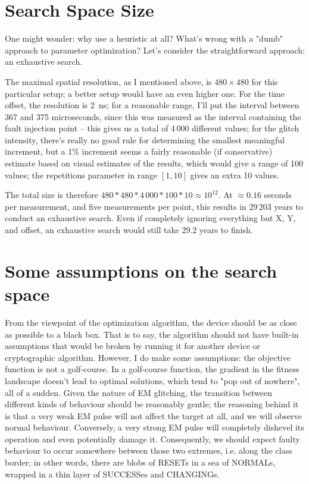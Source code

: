 \documentclass[times, utf8, diplomski]{fer}
\begin{document}
\section{Search Space Size}\label{sec:search_space}
One might wonder: why use a heuristic at all? What's wrong with a "dumb"
approach to parameter optimization? Let's consider the straightforward
approach: an exhaustive search.

The maximal spatial resolution, as I mentioned above, is $480 \times 480$ for
this particular setup; a better setup would have an even higher one. For the
time offset, the resolution is \SI{2}{\nano\second}; for a reasonable range,
I'll put the interval between 367 and 375 microseconds, since this was measured
as the interval containing the fault injection point -- this gives us a total of
4\,000 different values; for the glitch intensity, there's really no good rule
for determining the smallest meaningful increment, but a 1\% increment seems
a fairly reasonable (if conservative) estimate based on visual estimates of
the results, which would give a range of 100 values; the repetitions parameter
in range $[1,10]$ gives an extra 10 values.

The total size is therefore $480*480*4\,000*100*10\approx 10^{12}$.
At $\approx0.16$ seconds per measurement, and five measurements per point, this
results in 29\,203 years to conduct an exhaustive search. Even if completely
ignoring everything but X, Y, and offset, an exhaustive search would still
take 29.2 years to finish.



\section{Some assumptions on the search space}\label{sec:assumptions}
From the viewpoint of the optimization algorithm, the device should be as close
as possible to a black box. That is to say, the algorithm should not have built-in
assumptions that would be broken by running it for another device or cryptographic
algorithm. However, I do make some assumptions:
the objective function is not a golf-course. In a golf-course function, the
gradient in the fitness landscape doesn't lead to optimal solutions, which tend
to "pop out of nowhere", all of a sudden. Given the nature of EM glitching, the
transition between different kinds of behaviour should be reasonably gentle; the
reasoning behind it is that a very weak EM pulse will not affect the target at all,
and we will observe normal behaviour. Conversely, a very strong EM pulse will
completely dishevel its operation and even potentially damage it. Consequently,
we should expect faulty behaviour to occur somewhere between those two extremes,
i.e. along the class border; in other words, there are blobs of RESETs in a sea
of NORMALs, wrapped in a thin layer of SUCCESSes and CHANGINGs.
\end{document}

